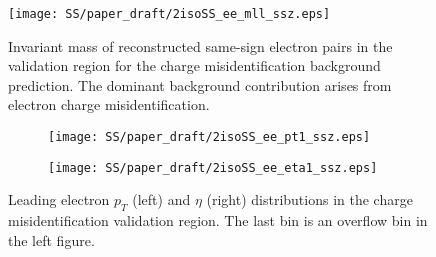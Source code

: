 \begin{figure}[h]
\begin{center}
\texttt{[image: SS/paper\_draft/2isoSS\_ee\_mll\_ssz.eps]}
\caption{Invariant mass of reconstructed same-sign electron pairs in the validation region for the charge misidentification background prediction.
The dominant background contribution arises from electron charge misidentification.
}
\label{fig:charge_flip_CR_inv_mass}
\end{center}
\end{figure} 

\begin{figure}[h]
\begin{subfigure}{.5\textwidth}
  \centering
  \texttt{[image: SS/paper\_draft/2isoSS\_ee\_pt1\_ssz.eps]}
\end{subfigure}%
\begin{subfigure}{.5\textwidth}
  \centering
  \texttt{[image: SS/paper\_draft/2isoSS\_ee\_eta1\_ssz.eps]}
\end{subfigure}
\caption{Leading electron $p_T$ (left) and $\eta$ (right) distributions in the charge misidentification validation region. The last bin is an overflow bin in the left figure.}
  \label{fig:charge_flip_CR_kinematics}
\end{figure}



